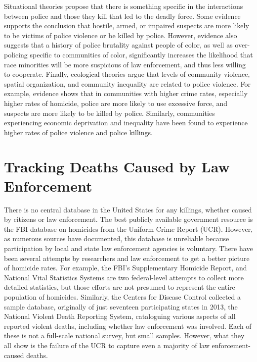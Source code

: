\documentclass[sigconf]{acmart}
\begin{document}
Situational theories propose that there is something specific in the interactions between police and those they kill that led to the deadly force.  Some evidence supports the conclusion that hostile, armed, or impaired suspects are more likely to be victims of police violence or be killed by police. \cite{nix17}  However, evidence also suggests that a history of police brutality against people of color, as well as over-policing specific to communities of color, significantly increases the likelihood that race minorities will be more suspicious of law enforcement, and thus less willing to cooperate. \cite{payne17,kent05} Finally, ecological theories argue that levels of community violence, spatial organization, and community inequality are related to police violence.  For example, evidence shows that in communities with higher crime rates, especially higher rates of homicide, police are more likely to use excessive force, and suspects are more likely to be killed by police. \cite{nix17,smith04,smith14}  Similarly, communities experiencing economic deprivation and inequality have been found to experience higher rates of police violence and police killings. \cite{jacobs02,meeks06,stults07,legewie15,payne17}

\section{Tracking Deaths Caused by Law Enforcement}
There is no central database in the United States for any killings, whether caused by citizens or law enforcement.  The best publicly available government resource is the FBI database on homicides from the Uniform Crime Report (UCR).  However, as numerous sources have documented, this database is unreliable because participation by local and state law enforcement agencies is voluntary. \cite{currie16,pridemore05,dalton17} There have been several attempts by researchers and law enforcement to get a better picture of homicide rates.  For example, the FBI's Supplementary Homicide Report, and National Vital Statistics Systems are two federal-level attempts to collect more detailed statistics, but those efforts are not presumed to represent the entire population of homicides. \cite{pridemore05}  Similarly, the Centers for Disease Control collected a sample database, originally of just seventeen participating states in 2013, the National Violent Death Reporting System, cataloguing various aspects of all reported violent deaths, including whether law enforcement was involved. \cite{cdc13}  Each of these is not a full-scale national survey, but small samples.  However, what they all show is the failure of the UCR to capture even a majority of law enforcement-caused deaths.
\end{document}
